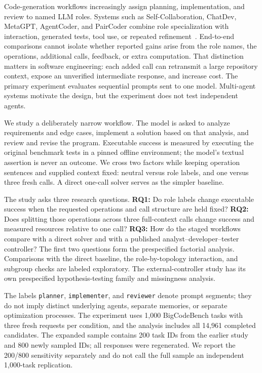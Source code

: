 \documentclass[10pt,letterpaper]{article}
\begin{document}
Code-generation workflows increasingly assign planning, implementation, and review to named LLM roles. Systems such as Self-Collaboration, ChatDev, MetaGPT, AgentCoder, and PairCoder combine role specialization with interaction, generated tests, tool use, or repeated refinement~\cite{dong2023selfcollaboration,qian2024chatdev,hong2024metagpt,huang2023agentcoder,zhang2024paircoder}. End-to-end comparisons cannot isolate whether reported gains arise from the role names, the operations, additional calls, feedback, or extra computation. That distinction matters in software engineering: each added call can retransmit a large repository context, expose an unverified intermediate response, and increase cost. The primary experiment evaluates sequential prompts sent to one model. Multi-agent systems motivate the design, but the experiment does not test independent agents.

We study a deliberately narrow workflow. The model is asked to analyze requirements and edge cases, implement a solution based on that analysis, and review and revise the program. Executable success is measured by executing the original benchmark tests in a pinned offline environment; the model's textual assertion is never an outcome. We cross two factors while keeping operation sentences and supplied context fixed: neutral versus role labels, and one versus three fresh calls. A direct one-call solver serves as the simpler baseline.

The study asks three research questions. \textbf{RQ1:} Do role labels change executable success when the requested operations and call structure are held fixed? \textbf{RQ2:} Does splitting those operations across three full-context calls change success and measured resources relative to one call? \textbf{RQ3:} How do the staged workflows compare with a direct solver and with a published analyst--developer--tester controller? The first two questions form the prespecified factorial analysis. Comparisons with the direct baseline, the role-by-topology interaction, and subgroup checks are labeled exploratory. The external-controller study has its own prespecified hypothesis-testing family and missingness analysis.

The labels \texttt{planner}, \texttt{implementer}, and \texttt{reviewer} denote prompt segments; they do not imply distinct underlying agents, separate memories, or separate optimization processes. The experiment uses 1,000 BigCodeBench tasks with three fresh requests per condition, and the analysis includes all 14,961 completed candidates. The expanded sample contains 200 task IDs from the earlier study and 800 newly sampled IDs; all responses were regenerated. We report the 200/800 sensitivity separately and do not call the full sample an independent 1,000-task replication.
\end{document}
